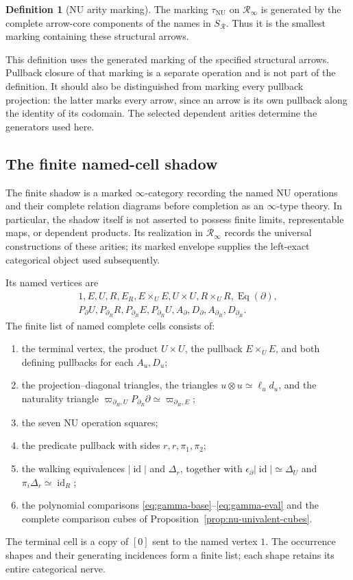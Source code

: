 \documentclass[oneside]{article}
\theoremstyle{plain}
\theoremstyle{definition}
\newtheorem{definition}[theorem]{Definition}
\theoremstyle{remark}
\newcommand{\Eq}{\operatorname{Eq}}
\newcommand{\NU}{\mathrm{NU}}
\newcommand{\RNU}{\mathcal R_{\infty}}
\newcommand{\id}{\operatorname{id}}
\begin{document}
\begin{definition}[NU arity marking]\label{def:nu-marking}
The marking $\tau_{\NU}$ on $\RNU$ is generated by the complete
arrow-core components of the names in $S_{\mathcal R}$. Thus it is the
smallest marking containing these structural arrows.
\end{definition}

This definition uses the generated marking of the specified structural
arrows. Pullback closure of that marking is a separate operation and is
not part of the definition. It should also be distinguished from marking
every pullback projection: the latter marks every arrow, since an arrow
is its own pullback along the identity of its codomain. The selected
dependent arities determine the generators used here.

\subsection{The finite named-cell shadow}\label{subsec:nu-shadow}

The finite shadow is a marked $\infty$-category recording the named NU
operations and their complete relation diagrams before completion as
an $\infty$-type theory. In particular, the shadow itself is not
asserted to possess finite limits, representable maps, or dependent
products. Its realization in $\RNU$ records the universal constructions
of these arities; its marked envelope supplies the left-exact categorical
object used subsequently.

Its named vertices are
\begin{gather*}
 1,E,U,R,E_R,E\times_U E,U\times U,R\times_U R,\Eq(\partial),\\
 P_\partial U,P_{\partial_R}R,P_{\partial_R}E,P_{\partial_R}U,
 A_\partial,D_\partial,A_{\partial_R},D_{\partial_R}.
\end{gather*}
The finite list of named complete cells consists of:
\begin{enumerate}
\item the terminal vertex, the product $U\times U$, the pullback
$E\times_U E$, and both defining pullbacks for each $A_u,D_u$;
\item the projection--diagonal triangles, the triangles
$u\otimes u\simeq\ell_ud_u$, and the naturality triangle
$\varpi_{\partial_R,U}P_{\partial_R}\partial
 \simeq\varpi_{\partial_R,E}$;
\item the seven NU operation squares;
\item the predicate pullback with sides $r,r,\pi_1,\pi_2$;
\item the walking equivalences $|\id|$ and $\Delta_r$, together with
$\epsilon_\partial|\id|\simeq\Delta_U$ and
$\pi_i\Delta_r\simeq\id_R$;
\item the polynomial comparisons
\eqref{eq:gamma-base}--\eqref{eq:gamma-eval} and the complete
comparison cubes of Proposition~\ref{prop:nu-univalent-cubes}.
\end{enumerate}
The terminal cell is a copy of $[0]$ sent to the named vertex $1$.
The occurrence shapes and their generating incidences form a finite
list; each shape retains its entire categorical nerve.
\end{document}
